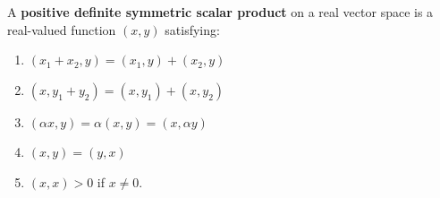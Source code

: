 A \textbf{positive definite symmetric scalar product} on a real vector space is a real-valued function $(x, y)$ satisfying:

\begin{enumerate}
\item $(x_1 + x_2, y) = (x_1, y) + (x_2, y)$
\item $(x, y_1 + y_2) = (x, y_1) + (x, y_2)$
\item $(\alpha x, y) = \alpha(x, y) = (x, \alpha y)$
\item $(x, y) = (y, x)$
\item $(x, x) > 0$ if $x \neq 0$.
\end{enumerate}
